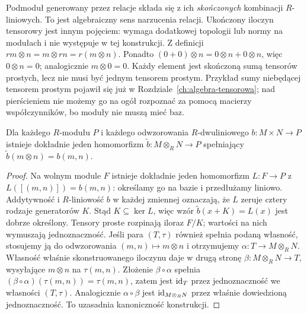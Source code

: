 Podmoduł generowany przez relacje składa się
z ich \emph{skończonych} kombinacji $R$-liniowych.
To jest algebraiczny sens narzucenia relacji.
Ukończony iloczyn tensorowy jest innym pojęciem:
wymaga dodatkowej topologii lub normy na modułach
i nie występuje w tej konstrukcji.
Z definicji
$rm\otimes n=m\otimes rn=r(m\otimes n)$.
Ponadto $(0+0)\otimes n=0\otimes n+0\otimes n$,
więc $0\otimes n=0$; analogicznie $m\otimes0=0$.
Każdy element jest skończoną sumą tensorów
prostych, lecz nie musi być jednym tensorem prostym.
Przykład sumy niebędącej tensorem prostym pojawił się już
w Rozdziale~\ref{ch:algebra-tensorowa}; nad pierścieniem
nie możemy go na ogół rozpoznać za pomocą macierzy
współczynników, bo moduły nie muszą mieć baz.

\begin{twierdzenie}
\label{thm:tensor-modulow-uniwersalnosc}
Dla każdego $R$-modułu $P$ i każdego
odwzorowania $R$-dwuliniowego
$b:M\times N\to P$ istnieje dokładnie
jeden homomorfizm $\widetilde b:M\otimes_R N\to P$
spełniający $\widetilde b(m\otimes n)=b(m,n)$.
\end{twierdzenie}
\begin{proof}
Na wolnym module $F$ istnieje dokładnie
jeden homomorfizm $L:F\to P$ z
$L([(m,n)])=b(m,n)$: określamy go na bazie
i przedłużamy liniowo. Addytywność i
$R$-liniowość $b$ w każdej zmiennej oznaczają,
że $L$ zeruje cztery rodzaje generatorów $K$.
Stąd $K\subseteq\ker L$, więc wzór
$\widetilde b(x+K)=L(x)$ jest dobrze określony.
Tensory proste rozpinają iloraz $F/K$;
wartości na nich wymuszają jednoznaczność.
Jeśli para $(T,\tau)$ również spełnia podaną własność,
stosujemy ją do odwzorowania $(m,n)\mapsto m\otimes n$
i otrzymujemy $\alpha:T\to M\otimes_R N$. Własność właśnie
skonstruowanego iloczynu daje w drugą stronę
$\beta:M\otimes_R N\to T$, wysyłające $m\otimes n$ na
$\tau(m,n)$. Złożenie $\beta\circ\alpha$ spełnia
$(\beta\circ\alpha)(\tau(m,n))=\tau(m,n)$, zatem
jest $\mathrm{id}_T$ przez jednoznaczność we własności $(T,\tau)$.
Analogicznie $\alpha\circ\beta$ jest $\mathrm{id}_{M\otimes_R N}$
przez właśnie dowiedzioną jednoznaczność.
To uzasadnia kanoniczność konstrukcji.
\end{proof}

